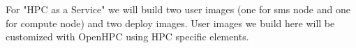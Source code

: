 For "HPC as a Service" we will build two user images (one for sms node and one for compute node) and two deploy images. User images we build here will be customized with OpenHPC using HPC specific elements. 
